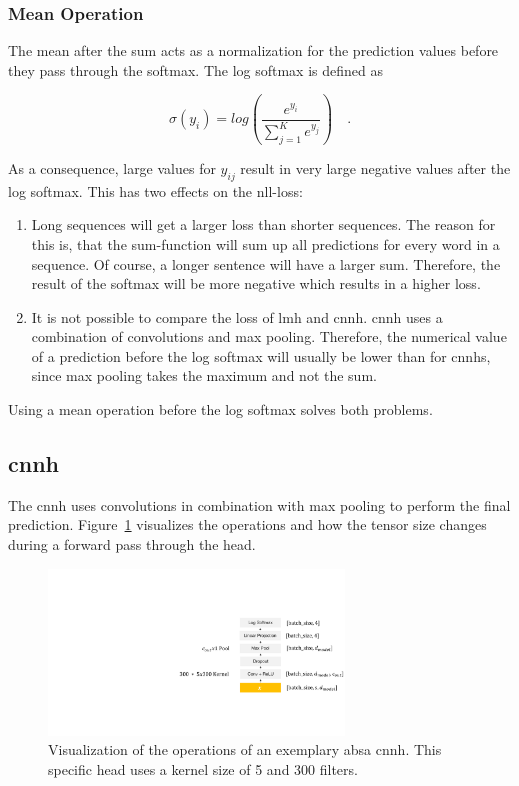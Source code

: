 \subsubsection*{Mean Operation}

The mean after the sum acts as a normalization for the prediction values before they pass through the softmax. The log softmax is defined as 

\begin{equation}
	\sigma(y_i)=log(\frac{e^{y_i}}{\sum_{j=1}^{K}e^{y_j}})\quad .
\end{equation}

As a consequence, large values for $y_{ij}$ result in very large negative values after the log softmax. This has two effects on the \gls{nll}-loss:

\begin{enumerate}
	\item Long sequences will get a larger loss than shorter sequences. The reason for this is, that the sum-function will sum up all predictions for every word in a sequence. Of course, a longer sentence will have a larger sum. Therefore, the result of the softmax will be more negative which results in a higher loss.
	\item It is not possible to compare the loss of \gls{lmh} and \gls{cnnh}. \gls{cnnh} uses  a combination of convolutions and max pooling. Therefore, the numerical value of a prediction before the log softmax will usually be lower than for \glspl{cnnh}, since max pooling takes the maximum and not the sum.
\end{enumerate}

Using a mean operation before the log softmax solves both problems.

\subsection{\acrfull{cnnh}}
The \acrfull{cnnh} uses convolutions in combination with max pooling to perform the final prediction. Figure~\ref{fig:04_ch1} visualizes the operations and how the tensor size changes during a forward pass through the head. 
\medskip
\begin{figure}[htp]
	\centering
	\includegraphics[width=0.7\textwidth]{figures/04_method/04_ch}
	\caption{Visualization of the operations of an exemplary \gls{absa} \acrfull{cnnh}. This specific head uses a kernel size of 5 and 300 filters.}
	\label{fig:04_ch1}
\end{figure}


